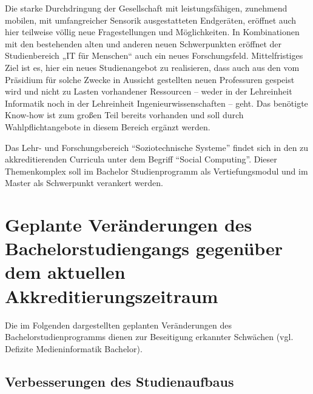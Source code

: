 \begin{siderules}
Die starke Durchdringung der Gesellschaft mit leistungsfähigen,
zunehmend mobilen, mit umfangreicher Sensorik ausgestatteten Endgeräten,
eröffnet auch hier teilweise völlig neue Fragestellungen und
Möglichkeiten. In Kombinationen mit den bestehenden alten und anderen
neuen Schwerpunkten eröffnet der Studienbereich „IT für Menschen`` auch
ein neues Forschungsfeld. Mittelfristiges Ziel ist es, hier ein neues
Studienangebot zu realisieren, dass auch aus den vom Präsidium für
solche Zwecke in Aussicht gestellten neuen Professuren gespeist wird und
nicht zu Lasten vorhandener Ressourcen -- weder in der Lehreinheit
Informatik noch in der Lehreinheit Ingenieurwissenschaften -- geht. Das
benötigte Know-how ist zum großen Teil bereits vorhanden und soll durch
Wahlpflichtangebote in diesem Bereich ergänzt werden.
\end{siderules}

Das Lehr- und Forschungsbereich ``Soziotechnische Systeme'' findet sich
in den zu akkreditierenden Curricula unter dem Begriff ``Social
Computing''. Dieser Themenkomplex soll im Bachelor Studienprogramm als
Vertiefungsmodul und im Master als Schwerpunkt verankert werden.

\section{Geplante Veränderungen des Bachelorstudiengangs gegenüber
dem aktuellen
Akkreditierungszeitraum}\label{geplante-veruxe4nderungen-des-bachelorstudiengangs-gegenuxfcber-dem-aktuellen-akkreditierungszeitraum}

Die im Folgenden dargestellten geplanten Veränderungen des
Bachelorstudienprogramms dienen zur Beseitigung erkannter Schwächen
(vgl. Defizite Medieninformatik Bachelor).

\subsection{Verbesserungen des
Studienaufbaus}\label{verbesserungen-des-studienaufbaus}

